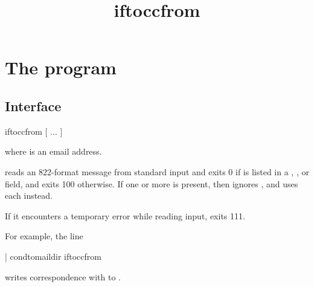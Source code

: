 \documentclass{book}
\title{iftoccfrom}
\begin{document}
\section{The  program}

\subsection{Interface}
\begin{code}%
  iftoccfrom [  ... ]
\end{code}
where  is an email address.

 reads an 822-format message from standard input and exits 0 if
 is listed in a , , or 
field, and exits 100 otherwise.  
If one or more  is present, then  ignores
, and uses each  instead.

If it encounters a temporary error while reading input,  exits
111.

For example, the  line
\begin{code}%
  | condtomaildir  iftoccfrom 
\end{code}
writes correspondence with  to .
\end{document}
